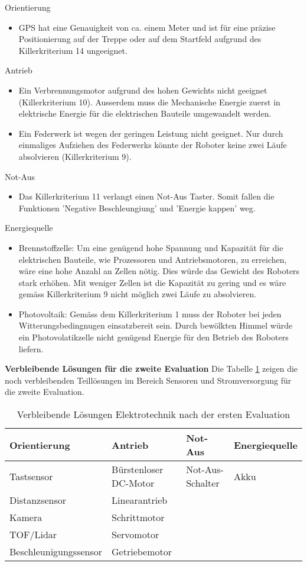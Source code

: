 Orientierung
\begin{itemize}
    \item GPS hat eine Genauigkeit von ca. einem Meter und ist für eine präzise Positionierung auf der Treppe oder auf dem Startfeld aufgrund des Killerkriterium 14 ungeeignet.
\end{itemize}
Antrieb
\begin{itemize}
    \item Ein Verbrennungsmotor aufgrund des hohen Gewichts nicht geeignet (Killerkriterium 10). Ausserdem muss die Mechanische Energie zuerst in elektrische Energie für die elektrischen Bauteile umgewandelt werden.
    \item Ein Federwerk ist wegen der geringen Leistung nicht geeignet. Nur durch einmaliges Aufziehen des Federwerks könnte der Roboter keine zwei Läufe absolvieren (Killerkriterium 9).
\end{itemize}
Not-Aus
\begin{itemize}
    \item Das Killerkriterium 11 verlangt einen Not-Aus Taster. Somit fallen die Funktionen 'Negative Beschleungiung' und 'Energie kappen' weg.
\end{itemize}
Energiequelle
\begin{itemize}
    \item Brennstoffzelle: Um eine genügend hohe Spannung und Kapazität für die elektrischen Bauteile, wie Prozessoren und Antriebsmotoren, zu erreichen, wäre eine hohe Anzahl an Zellen nötig. Dies würde das Gewicht des Roboters stark erhöhen. Mit weniger Zellen ist die Kapazität zu gering und es wäre gemäss Killerkriterium 9 nicht möglich zwei Läufe zu absolvieren.
    \item Photovoltaik: Gemäss dem Killerkriterium 1 muss der Roboter bei jeden Witterungsbedingnugen einsatzbereit sein. Durch bewölkten Himmel würde ein Photovolatikzelle nicht genügend Energie für den Betrieb des Roboters liefern.
\end{itemize}

\textbf{Verbleibende Lösungen für die zweite Evaluation}
Die Tabelle \ref{tab:verbleibende-teillösungen-elektrotechnik} zeigen die noch verbleibenden Teillösungen im Bereich Sensoren und Stromversorgung für die zweite Evaluation.
\begin{center}
\begin{table}[h!]
    \begin{tabular}{l|l|l|l}
        \textbf{Orientierung} & \textbf{Antrieb} & \textbf{Not-Aus} & \textbf{Energiequelle} \\ 
        \hline
        Tastsensor & Bürstenloser DC-Motor & Not-Aus-Schalter & Akku\\  
        Distanzsensor & Linearantrieb &  &\\
        Kamera & Schrittmotor & &\\
        TOF/Lidar & Servomotor & &\\
        Beschleunigungssensor & Getriebemotor & & 
    \end{tabular}
    \caption{Verbleibende Lösungen Elektrotechnik nach der ersten Evaluation}
    \label{tab:verbleibende-teillösungen-elektrotechnik}
\end{table}
\end{center}


